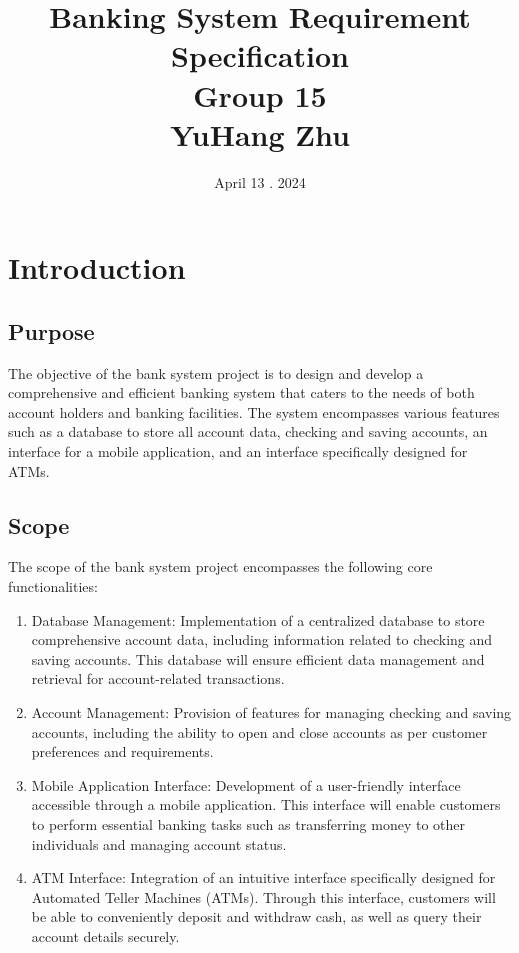 \documentclass[12pt]{article}
\title{\textbf{Banking System Requirement Specification}\\[1cm]
\large Group 15 \\[0.5cm]
{\normalfont YuHang Zhu}}
\author{}
\date{April 13 . 2024}
\begin{document}
\begin{titlepage}
\maketitle
\end{titlepage}

\newpage

\section{Introduction}



\subsection{Purpose}

The objective of the bank system project is to design and develop a comprehensive and efficient banking system that caters to the needs of both account holders and banking facilities. The system encompasses various features such as a database to store all account data, checking and saving accounts, an interface for a mobile application, and an interface specifically designed for ATMs.

\subsection{Scope}

The scope of the bank system project encompasses the following core functionalities:

\begin{enumerate}
\item Database Management: Implementation of a centralized database to store comprehensive account data, including information related to checking and saving accounts. This database will ensure efficient data management and retrieval for account-related transactions.

\item Account Management: Provision of features for managing checking and saving accounts, including the ability to open and close accounts as per customer preferences and requirements.

\item Mobile Application Interface: Development of a user-friendly interface accessible through a mobile application. This interface will enable customers to perform essential banking tasks such as transferring money to other individuals and managing account status.

\item ATM Interface: Integration of an intuitive interface specifically designed for Automated Teller Machines (ATMs). Through this interface, customers will be able to conveniently deposit and withdraw cash, as well as query their account details securely.
\end{enumerate}
\end{document}
